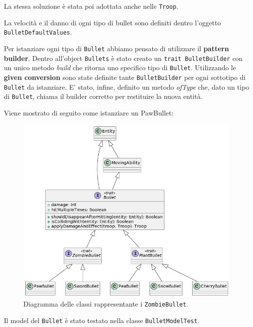 



La stessa soluzione è stata poi adottata anche nelle \texttt{Troop}.

La velocità e il danno di ogni tipo di bullet sono definiti dentro l'oggetto \texttt{BulletDefaultValues}.

Per istanziare ogni tipo di \texttt{Bullet} abbiamo pensato di utilizzare il \textbf{pattern builder}.
Dentro all'object \texttt{Bullets} è stato creato un \texttt{trait BulletBuilder}
con un unico metodo \textit{build} che ritorna uno specifico tipo di \texttt{Bullet}.
Utilizzando le \textbf{given conversion} sono state definite tante \texttt{BulletBuilder} per ogni sottotipo di \texttt{Bullet} da istanziare.
E' stato, infine, definito un metodo \textit{ofType} che, dato un tipo
di \texttt{Bullet}, chiama il builder corretto per restituire la nuova entità.



Viene mostrato di seguito come istanziare un PawBullet:



\begin{figure}[H]
    \centering
    \includegraphics[width=1\linewidth]{images/model-bullet}
    \caption{Diagramma delle classi rappresentante i \texttt{ZombieBullet}.}
    \label{fig:class-bullet}
\end{figure}

Il model del \texttt{Bullet} è stato testato nella classe \texttt{BulletModelTest}.

